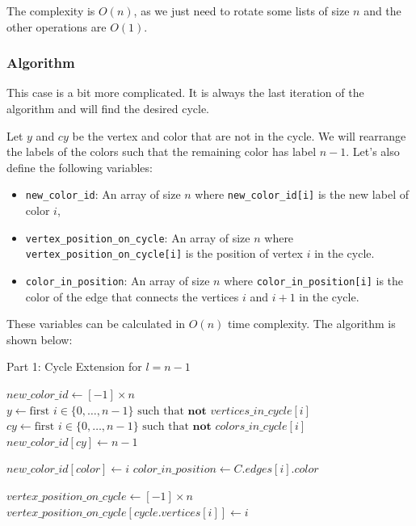 \begin{itemize}
    The complexity is $O(n)$, as we just need to rotate some lists of size $n$ and the other operations are $O(1)$.
\end{itemize}

\subsubsection{Algorithm}

This case is a bit more complicated. It is always the last iteration of the algorithm and will
find the desired cycle.

Let $y$ and $cy$ be the vertex and color that are not in the cycle. We will rearrange the labels
of the colors such that the remaining color has label $n - 1$. Let's also define the following variables:

\begin{itemize}
    \item \texttt{new\_color\_id}: An array of size \( n \) where \texttt{new\_color\_id[i]} is the new label of color \( i \),
    \item \texttt{vertex\_position\_on\_cycle}: An array of size \( n \) where \texttt{vertex\_position\_on\_cycle[i]} is the position of vertex \( i \) in the cycle.
    \item \texttt{color\_in\_position}: An array of size \( n \) where \texttt{color\_in\_position[i]} is the color of the edge that connects the vertices \( i \) and \( i + 1 \) in the cycle.
\end{itemize}

These variables can be calculated in \( O(n) \) time complexity. The algorithm is shown below:

\begin{algorithm}
    \caption{Part 1: Cycle Extension for \( l = n - 1 \)}
    \begin{algorithmic}
            \State $new\_color\_id \gets [-1] \times n$
            \State $y \gets \text{first } i \in \{0, \dots, n-1\} \text{ such that } \textbf{not } vertices\_in\_cycle[i]$
            \State $cy \gets \text{first } i \in \{0, \dots, n-1\} \text{ such that } \textbf{not } colors\_in\_cycle[i]$
            \State $new\_color\_id[cy] \gets n - 1$
            
                \State $new\_color\_id[color] \gets i$
                \State $color\_in\_position \gets C.edges[i].color$
            \EndFor
            
            \State $vertex\_position\_on\_cycle \gets [-1] \times n$
                \State $vertex\_position\_on\_cycle[cycle.vertices[i]] \gets i$
            \EndFor
        \EndFunction
    \end{algorithmic}
\end{algorithm}

